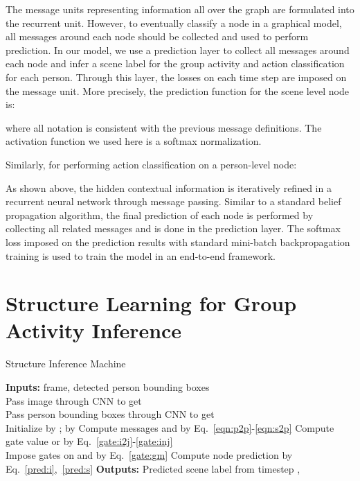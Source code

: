 \documentclass[10pt,twocolumn,letterpaper]{article}
\begin{document}
The message units representing information all over the graph are formulated into the recurrent unit. However, to eventually classify a node in a graphical model, all messages around each node should be collected and used to perform prediction. In our model, we use a prediction layer to collect all messages around each node and infer a scene label for the group activity and action classification for each person. Through this layer, the losses on each time step are imposed on the message unit. More precisely, the prediction function for the scene level node is:

where all notation is consistent with the previous message definitions. The activation function we used here is a softmax normalization.

Similarly, for performing action classification on a person-level node:


As shown above, the hidden contextual information is iteratively refined in a recurrent neural network through message passing. Similar to a standard belief propagation algorithm, the final prediction of each node is performed by collecting all related messages and is done in the prediction layer. The softmax loss imposed on the prediction results with standard mini-batch backpropagation training is used to train the model in an end-to-end framework.





\section{Structure Learning for Group Activity Inference}
\label{sec:sl_rnn}


\begin{algorithm}
\caption{Structure Inference Machine}
\label{alg}
\begin{algorithmic}
    \STATE \textbf{Inputs:} frame, detected person bounding boxes\\
    Pass image through CNN to get \\
    Pass person bounding boxes through CNN to get \\
    Initialize  by ;  by  
    \STATE Compute messages  and  by Eq.~\ref{eqn:p2p}-\ref{eqn:s2p}
    \ENDFOR
    \STATE Compute gate value  or  by Eq.~\ref{gate:i2j}-\ref{gate:inj} \\
    Impose gates on  and  by Eq.~\ref{gate:gm}
    \ENDFOR
    \STATE Compute node prediction  by Eq.~\ref{pred:i},~\ref{pred:s}
    \ENDFOR
    \ENDFOR
    \STATE \textbf{Outputs: } Predicted scene label from timestep , 
\end{algorithmic}
\end{algorithm}
\end{document}
